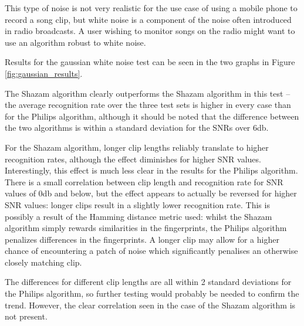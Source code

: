 \documentclass[12pt,a4paper,twoside,openright]{report}
\begin{document}
This type of noise is not very realistic for the use case of using a mobile phone to record a song clip, but white noise is a component of the noise often introduced in radio broadcasts. A user wishing to monitor songs on the radio might want to use an algorithm robust to white noise.

Results for the gaussian white noise test can be seen in the two graphs in Figure \ref{fig:gaussian_results}. 

The Shazam algorithm clearly outperforms the Shazam algorithm in this test -- the average recognition rate over the three test sets is higher in every case than for the Philips algorithm, although it should be noted that the difference between the two algorithms is within a standard deviation for the SNRs over 6db.

For the Shazam algorithm, longer clip lengths reliably translate to higher recognition rates, although the effect diminishes for higher SNR values. Interestingly, this effect is much less clear in the results for the Philips algorithm. There is a small correlation between clip length and recognition rate for SNR values of 0db and below, but the effect appears to actually be reversed for higher SNR values: longer clips result in a slightly lower recognition rate. This is possibly a result of the Hamming distance metric used: whilst the Shazam algorithm simply rewards similarities in the fingerprints, the Philips algorithm penalizes differences in the fingerprints. A longer clip may allow for a higher chance of encountering a patch of noise which significantly penalises an otherwise closely matching clip.

The differences for different clip lengths are all within 2 standard deviations for the Philips algorithm, so further testing would probably be needed to confirm the trend. However, the clear correlation seen in the case of the Shazam algorithm is not present.
\end{document}
